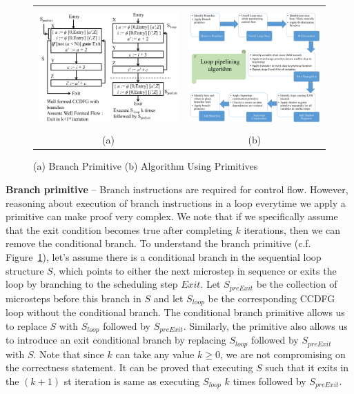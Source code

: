 \begin{figure}[H]
\begin{center}
\begin{tabular}{cc}
\includegraphics[height=1.8in]{fig-proposal/conditional-branch-primitive}
& 
\includegraphics[height=1.8in]{fig-proposal/algorithm-using-primitives}
\\
(a) &  (b) 
\end{tabular}
\end{center}
\caption{(a) Branch Primitive (b) Algorithm Using Primitives}
\label{fig:branch-primitive}
\end{figure}

{\textbf {Branch primitive}} -- Branch instructions are required for control flow. However, reasoning about 
execution of branch instructions in a loop everytime we apply a primitive can make proof very complex.
We note that if we specifically assume that the exit condition becomes true after completing $k$ iterations, then we can remove the conditional branch.
To understand the branch primitive (c.f. Figure~\ref{fig:branch-primitive}), 
let's assume there is a conditional branch in the sequential loop structure $S$, which points to either
the next microstep in sequence or exits the loop by branching to the scheduling step
$Exit$. Let $S_{preExit}$ be the collection of microsteps before this branch in $S$ and
let $S_{loop}$ be the corresponding CCDFG loop without the conditional branch.
The conditional branch primitive allows us to replace $S$ with $S_{loop}$ followed by
$S_{preExit}$. Similarly,
the primitive also allows us to introduce an exit conditional branch by replacing
$S_{loop}$ followed by $S_{preExit}$ with $S$.
Note that since $k$ can take any value $k \ge 0$, we are not compromising on the correctness statement.  
It can be proved that executing $S$ such that it exits in the $(k+1)$ st
iteration is same as executing $S_{loop}$ $k$ times followed by $S_{preExit}$.

